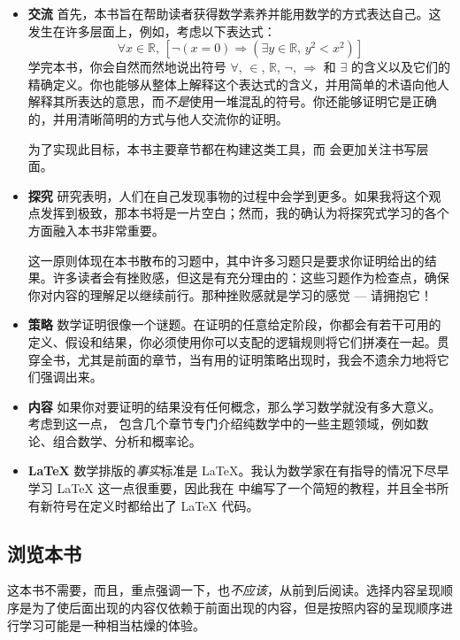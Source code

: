\begin{itemize}
\item \textbf{交流  } 首先，本书旨在帮助读者获得数学素养并能用数学的方式表达自己。这发生在许多层面上，例如，考虑以下表达式：
\[ \forall x \in \mathbb{R},\, [\neg(x = 0) \Rightarrow (\exists y \in \mathbb{R},\, y^2 < x^2)] \]
学完本书，你会自然而然地说出符号 $\forall$, $\in$, $\mathbb{R}$, $\neg$, $\Rightarrow$ 和 $\exists$ 的含义以及它们的精确定义。你也能够从整体上解释这个表达式的含义，并用简单的术语向他人解释其所表达的意思，而\textit{不是}使用一堆混乱的符号。你还能够证明它是正确的，并用清晰简明的方式与他人交流你的证明。

为了实现此目标，本书主要章节都在构建这类工具，而  会更加关注书写层面。

\item \textbf{探究  } 研究表明，人们在自己发现事物的过程中会学到更多。如果我将这个观点发挥到极致，那本书将是一片空白；然而，我的确认为将探究式学习的各个方面融入本书非常重要。

这一原则体现在本书散布的习题中，其中许多习题只是要求你证明给出的结果。许多读者会有挫败感，但这是有充分理由的：这些习题作为检查点，确保你对内容的理解足以继续前行。那种挫败感就是学习的感觉 --- 请拥抱它！

\item \textbf{策略  } 数学证明很像一个谜题。在证明的任意给定阶段，你都会有若干可用的定义、假设和结果，你必须使用你可以支配的逻辑规则将它们拼凑在一起。贯穿全书，尤其是前面的章节，当有用的证明策略出现时，我会不遗余力地将它们强调出来。

\item \textbf{内容  } 如果你对要证明的结果没有任何概念，那么学习数学就没有多大意义。考虑到这一点， 包含几个章节专门介绍纯数学中的一些主题领域，例如数论、组合数学、分析和概率论。

\item \textbf{\LaTeX{}  } 数学排版的\textit{事实}标准是 \LaTeX{}。我认为数学家在有指导的情况下尽早学习 \LaTeX{} 这一点很重要，因此我在  中编写了一个简短的教程，并且全书所有新符号在定义时都给出了 \LaTeX{} 代码。

\end{itemize}



\subsection*{浏览本书}

这本书不需要，而且，重点强调一下，也\textit{不应该}，从前到后阅读。选择内容呈现顺序是为了使后面出现的内容仅依赖于前面出现的内容，但是按照内容的呈现顺序进行学习可能是一种相当枯燥的体验。

